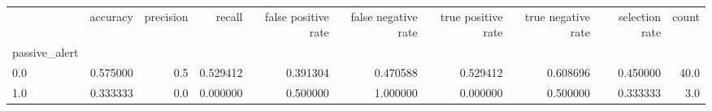 \begin{tabular}{lrrrrrrrrr}
\toprule
{} &  accuracy &  precision &    recall &  false positive rate &  false negative rate &  true positive rate &  true negative rate &  selection rate &  count \\
passive\_alert &           &            &           &                      &                      &                     &                     &                 &        \\
\midrule
0.0           &  0.575000 &        0.5 &  0.529412 &             0.391304 &             0.470588 &            0.529412 &            0.608696 &        0.450000 &   40.0 \\
1.0           &  0.333333 &        0.0 &  0.000000 &             0.500000 &             1.000000 &            0.000000 &            0.500000 &        0.333333 &    3.0 \\
\bottomrule
\end{tabular}
